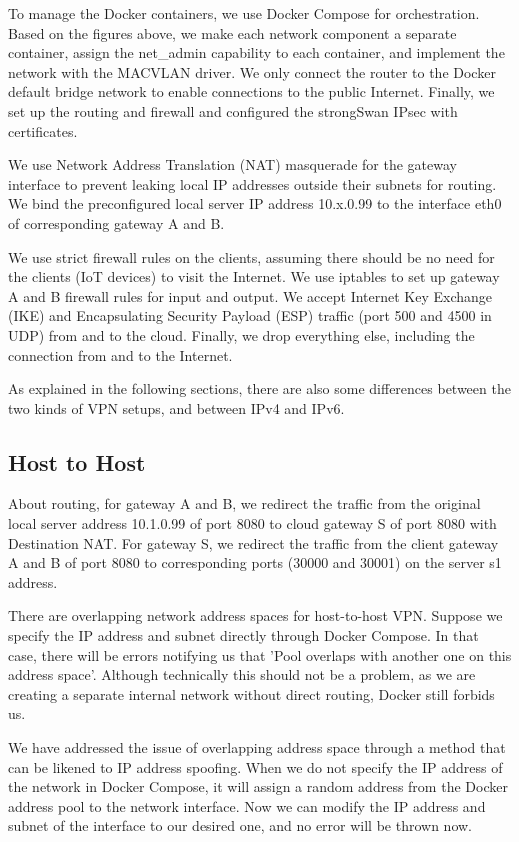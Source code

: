 \documentclass[article]{aaltoseries}
\begin{document}
To manage the Docker containers, we use Docker Compose for orchestration. Based on the figures above, we make each network component a separate container, assign the net\_admin capability to each container, and implement the network with the MACVLAN driver. We only connect the router to the Docker default bridge network to enable connections to the public Internet. Finally, we set up the routing and firewall and configured the strongSwan IPsec with certificates.

We use Network Address Translation (NAT) masquerade for the gateway interface to prevent leaking local IP addresses outside their subnets for routing. We bind the preconfigured local server IP address 10.x.0.99 to the interface eth0 of corresponding gateway A and B.

We use strict firewall rules on the clients, assuming there should be no need for the clients (IoT devices) to visit the Internet. We use iptables to set up gateway A and B firewall rules for input and output. We accept Internet Key Exchange (IKE) and Encapsulating Security Payload (ESP) traffic (port 500 and 4500 in UDP) from and to the cloud. Finally, we drop everything else, including the connection from and to the Internet.

As explained in the following sections, there are also some differences between the two kinds of VPN setups, and between IPv4 and IPv6.

\subsection{Host to Host}

About routing, for gateway A and B, we redirect the traffic from the original local server address 10.1.0.99 of port 8080 to cloud gateway S of port 8080 with Destination NAT. For gateway S, we redirect the traffic from the client gateway A and B of port 8080 to corresponding ports (30000 and 30001) on the server s1 address.

There are overlapping network address spaces for host-to-host VPN. Suppose we specify the IP address and subnet directly through Docker Compose. In that case, there will be errors notifying us that 'Pool overlaps with another one on this address space'. Although technically this should not be a problem, as we are creating a separate internal network without direct routing, Docker still forbids us.

We have addressed the issue of overlapping address space through a method that can be likened to IP address spoofing. When we do not specify the IP address of the network in Docker Compose, it will assign a random address from the Docker address pool to the network interface. Now we can modify the IP address and subnet of the interface to our desired one, and no error will be thrown now.
\end{document}
